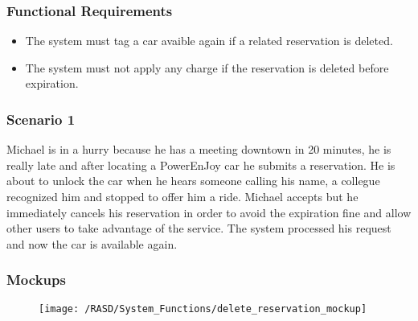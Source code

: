 \subsubsection{Functional Requirements}
\begin{itemize}
  \item The system must tag a car avaible again if a related reservation is deleted.
  \item The system must not apply any charge if the reservation is deleted before expiration.
\end{itemize}


\subsubsection{Scenario 1}
Michael is in a hurry because he has a meeting downtown in 20 minutes, he is really late and after locating a PowerEnJoy car he submits a reservation. He is about to unlock the car when he hears someone calling his name, a collegue recognized him and stopped to offer him a ride. Michael accepts but he immediately cancels his reservation in order to avoid the expiration fine and allow other users to take advantage of the service. The system processed his request and now the car is available again. 


\subsubsection{Mockups}
\begin{figure}[!ht]
  \centering
  \vspace{0.2cm}
  \texttt{[image: /RASD/System\_Functions/delete\_reservation\_mockup]}\\
  \vspace{0.4cm}
  \label{fig:delete_reservation} 
\end{figure}



